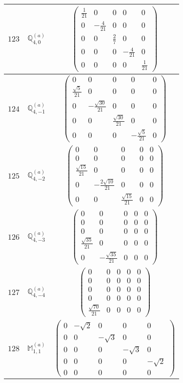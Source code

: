 \documentclass[fleqn,8pt,landscape]{jsarticle}
\begin{document}
\begin{center}
\begin{longtable}{ccc}
$ 123 $ & $ \mathbb{Q}_{4,0}^{(a)} $ & $ \begin{pmatrix} \frac{1}{21} & 0 & 0 & 0 & 0 \\ 0 & - \frac{4}{21} & 0 & 0 & 0 \\ 0 & 0 & \frac{2}{7} & 0 & 0 \\ 0 & 0 & 0 & - \frac{4}{21} & 0 \\ 0 & 0 & 0 & 0 & \frac{1}{21} \end{pmatrix} $ \\ \hline
$ 124 $ & $ \mathbb{Q}_{4,-1}^{(a)} $ & $ \begin{pmatrix} 0 & 0 & 0 & 0 & 0 \\ \frac{\sqrt{5}}{21} & 0 & 0 & 0 & 0 \\ 0 & - \frac{\sqrt{30}}{21} & 0 & 0 & 0 \\ 0 & 0 & \frac{\sqrt{30}}{21} & 0 & 0 \\ 0 & 0 & 0 & - \frac{\sqrt{5}}{21} & 0 \end{pmatrix} $ \\ \hline
$ 125 $ & $ \mathbb{Q}_{4,-2}^{(a)} $ & $ \begin{pmatrix} 0 & 0 & 0 & 0 & 0 \\ 0 & 0 & 0 & 0 & 0 \\ \frac{\sqrt{15}}{21} & 0 & 0 & 0 & 0 \\ 0 & - \frac{2 \sqrt{10}}{21} & 0 & 0 & 0 \\ 0 & 0 & \frac{\sqrt{15}}{21} & 0 & 0 \end{pmatrix} $ \\ \hline
$ 126 $ & $ \mathbb{Q}_{4,-3}^{(a)} $ & $ \begin{pmatrix} 0 & 0 & 0 & 0 & 0 \\ 0 & 0 & 0 & 0 & 0 \\ 0 & 0 & 0 & 0 & 0 \\ \frac{\sqrt{35}}{21} & 0 & 0 & 0 & 0 \\ 0 & - \frac{\sqrt{35}}{21} & 0 & 0 & 0 \end{pmatrix} $ \\ \hline
$ 127 $ & $ \mathbb{Q}_{4,-4}^{(a)} $ & $ \begin{pmatrix} 0 & 0 & 0 & 0 & 0 \\ 0 & 0 & 0 & 0 & 0 \\ 0 & 0 & 0 & 0 & 0 \\ 0 & 0 & 0 & 0 & 0 \\ \frac{\sqrt{70}}{21} & 0 & 0 & 0 & 0 \end{pmatrix} $ \\ \hline
$ 128 $ & $ \mathbb{M}_{1,1}^{(a)} $ & $ \begin{pmatrix} 0 & - \sqrt{2} & 0 & 0 & 0 \\ 0 & 0 & - \sqrt{3} & 0 & 0 \\ 0 & 0 & 0 & - \sqrt{3} & 0 \\ 0 & 0 & 0 & 0 & - \sqrt{2} \\ 0 & 0 & 0 & 0 & 0 \end{pmatrix} $ \\ \hline

\end{longtable}
\end{center}
\end{document}
